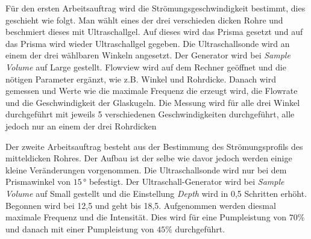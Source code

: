 \begin{flushleft}
    Für den ersten Arbeitsauftrag wird die Strömungsgeschwindigkeit bestimmt, dies geschieht wie folgt.
    Man wählt eines der drei verschieden dicken Rohre und beschmiert dieses mit Ultraschallgel. 
    Auf dieses wird das Prisma gesetzt und auf das Prisma wird wieder Ultraschallgel gegeben.
    Die Ultraschallsonde wird an einem der drei wählbaren Winkeln angesetzt.
    Der Generator wird bei \textit{Sample Volume} auf Large gestellt.
    Flowview wird auf dem Rechner geöffnet und die nötigen Parameter ergänzt, wie z.B. Winkel und Rohrdicke.
    Danach wird gemessen und Werte wie die maximale Frequenz die erzeugt wird, die Flowrate und die Geschwindigkeit der Glaskugeln.
    Die Messung wird für alle drei Winkel durchgeführt mit jeweils 5 verschiedenen Geschwindigkeiten durchgeführt, alle jedoch nur an einem der drei Rohrdicken 
\end{flushleft}

\begin{flushleft}
    Der zweite Arbeitsauftrag besteht aus der Bestimmung des Strömungsprofils des mitteldicken Rohres. 
    Der Aufbau ist der selbe wie davor jedoch werden einige kleine Veränderungen vorgenommen.
    Die Ultraschallsonde wird nur bei dem Prismawinkel von $15\,\unit{\degree}$ befestigt. 
    Der Ultraschall-Generator wird bei \textit{Sample Volume} auf Small gestellt und die Einstellung \textit{Depth} wird in 0,5 Schritten erhöht.
    Begonnen wird bei 12,5 und geht bis 18,5.
    Aufgenommen werden diesmal maximale Frequenz und die Intensität. 
    Dies wird für eine Pumpleistung von $70\%$ und danach mit einer Pumpleistung von $45\%$ durchgeführt.
\end{flushleft}